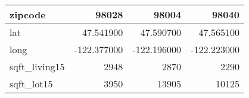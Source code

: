 \begin{table}[H]
\begin{tabular}{|l|r|r|r|}
\hline zipcode & \cellcolor[rgb]{0.9, 0.54, 0.52} 98028 & 98004 & 98040 \\
\hline lat & \cellcolor[rgb]{0.9, 0.54, 0.52} 47.541900 & 47.590700 & 47.565100 \\
\hline long & \cellcolor[rgb]{0.9, 0.54, 0.52} -122.377000 & \cellcolor[rgb]{0.9, 0.54, 0.52} -122.196000 & \cellcolor[rgb]{0.9, 0.54, 0.52} -122.223000 \\
\hline sqft\_living15 & \cellcolor[rgb]{0.9, 0.54, 0.52} 2948 & 2870 & 2290 \\
\hline sqft\_lot15 & \cellcolor[rgb]{0.9, 0.54, 0.52} 3950 & 13905 & 10125 \\
\hline
\end{tabular}
\end{table}
